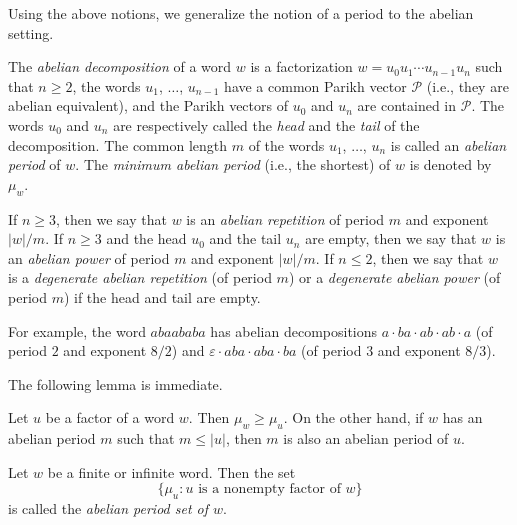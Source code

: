 \documentclass[a4paper,fleqn]{article}
\providecommand{\abs}[1]{\lvert#1\rvert}
\begin{document}
  Using the above notions, we generalize the notion of a period to the abelian setting.

  \begin{definition}\label{def:abelian_period}
    The \emph{abelian decomposition} of a word $w$ is a factorization $w = u_0 u_1 \cdots u_{n-1} u_n$ such that
    $n \geq 2$, the words $u_1$, $\ldots$, $u_{n-1}$ have a common Parikh vector $\mathcal{P}$ (i.e., they are abelian
    equivalent), and the Parikh vectors of $u_0$ and $u_n$ are contained in $\mathcal{P}$. The words $u_0$ and $u_n$
    are respectively called the \emph{head} and the \emph{tail} of the decomposition. The common length $m$ of the
    words $u_1$, $\ldots$, $u_n$ is called an \emph{abelian period} of $w$. The \emph{minimum abelian period} (i.e.,
    the shortest) of $w$ is denoted by $\mu_w$.

    If $n \geq 3$, then we say that $w$ is an \emph{abelian repetition} of period $m$ and exponent $\abs{w}/m$. If
    $n \geq 3$ and the head $u_0$ and the tail $u_n$ are empty, then we say that $w$ is an \emph{abelian power} of
    period $m$ and exponent $\abs{w}/m$. If $n \leq 2$, then we say that $w$ is a \emph{degenerate abelian repetition}
    (of period $m$) or a \emph{degenerate abelian power} (of period $m$) if the head and tail are empty.
  \end{definition}

  For example, the word $abaababa$ has abelian decompositions $a \cdot ba \cdot ab \cdot ab \cdot a$ (of period $2$ and
  exponent $8/2$) and $\varepsilon \cdot aba \cdot aba \cdot ba$ (of period $3$ and exponent $8/3$).

  The following lemma is immediate.

  \begin{lemma}\label{lem:abelian_period_covering}
    Let $u$ be a factor of a word $w$. Then $\mu_w \geq \mu_u$. On the other hand, if $w$ has an abelian period $m$
    such that $m \leq \abs{u}$, then $m$ is also an abelian period of $u$.
  \end{lemma}

  \begin{definition}
    Let $w$ be a finite or infinite word. Then the set
    \begin{equation*}
      \{\mu_u : \text{$u$ is a nonempty factor of $w$}\}
    \end{equation*}
    is called the \emph{abelian period set of $w$}.
  \end{definition}
\end{document}
